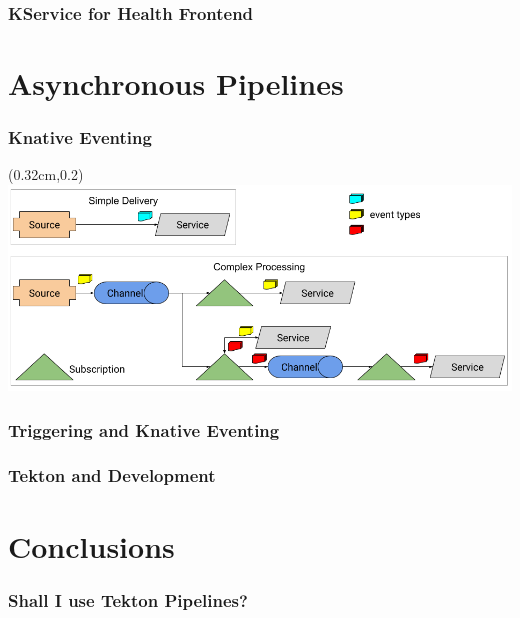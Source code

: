 \documentclass[aspectratio=169,11pt,hyperref={colorlinks=true}]{beamer}
\begin{document}
\begin{lblackrwhiteframe}
\begin{blackframe}
\begin{2columnsframe}
  {
  
  }
  {
  
  }
  \frametitle{KService for Health Frontend}
\end{2columnsframe}

\section{Asynchronous Pipelines}

\begin{tblackbgrayframe}
  \frametitle{Knative Eventing}
  \begin{textblock*}{\paperwidth}(0.32cm,0.2\paperheight)
    \centering
    \includegraphics[width=0.9\paperwidth]{img/eventing-control-plane.png}
  \end{textblock*}
\end{tblackbgrayframe}

\begin{grayframe}
  \frametitle{Triggering and Knative Eventing}
\end{grayframe}

\begin{grayframe}
  \frametitle{Tekton and Development}
\end{grayframe}

\section{Conclusions}

\begin{grayframe}
  \frametitle{Shall I use Tekton Pipelines?}
\end{grayframe}


\end{blackframe}
\end{lblackrwhiteframe}
\end{document}

